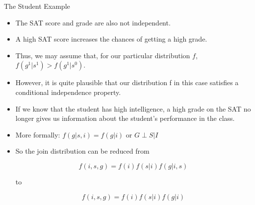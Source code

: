 \documentclass[handout]{beamer}
\begin{document}
\begin{frame}{The Student Example}
\scriptsize{
\begin{itemize}

\item The SAT score and grade are also not independent.
\item A high SAT score increases the chances of getting a high grade.

\item Thus, we may assume that, for our particular distribution $f$,
$f(g^1|s^1) > f(g^1|s^0)$.

\item However, it is quite plausible that our distribution f in this case satisfies a conditional independence property.

\item If we know that the student has high intelligence, a high grade on the
SAT no longer gives us information about the student's performance in the class.

\item More formally: $f(g|s,i)=f(g|i)$ or $G \perp S|I$

\item So the join distribution can be reduced from

\begin{displaymath}
 f(i,s,g)=f(i)f(s|i)f(g|i,s)
\end{displaymath}

to

\begin{displaymath}
 f(i,s,g)=f(i)f(s|i)f(g|i) 
\end{displaymath}


\end{itemize}



} 

\end{frame}
\end{document}
